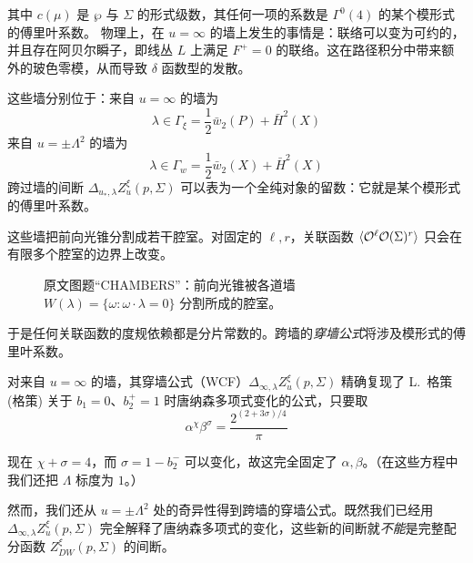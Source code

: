 其中 $c(\mu)$ 是 $\wp$ 与 $\Sigma$ 的形式级数，其任何一项的系数是 $\Gamma^{0}(4)$ 的某个模形式的傅里叶系数。
物理上，在 $u=\infty$ 的墙上发生的事情是：联络可以变为可约的，并且存在阿贝尔瞬子，即线丛 $L$ 上满足 $F^{+}=0$ 的联络。这在路径积分中带来额外的玻色零模，从而导致 $\delta$ 函数型的发散。

这些墙分别位于：来自 $u=\infty$ 的墙为
\begin{equation}
\lambda\in\Gamma_{\xi}=\frac{1}{2}\bar{w}_2(P)+\bar{H}^{2}(X)
\tag{7.22}
\end{equation}
来自 $u=\pm\Lambda^{2}$ 的墙为
\begin{equation}
\lambda\in\Gamma_{w}=\frac{1}{2}\bar{w}_2(X)+\bar{H}^{2}(X)
\tag{7.23}
\end{equation}
跨过墙的间断 $\Delta_{u_{*},\lambda}Z_u^{\xi}(p,\Sigma)$ 可以表为一个全纯对象的留数：它就是某个模形式的傅里叶系数。

这些墙把前向光锥分割成若干腔室。对固定的 $\ell,r$，关联函数 $\langle\mathcal{O}^{\ell}\mathcal{O}(\Sigma)^{r}\rangle$ 只会在有限多个腔室的边界上改变。

\begin{figure}[H]
  \centering
  \caption{原文图题“CHAMBERS”：前向光锥被各道墙 $W(\lambda)=\{\omega:\omega\cdot\lambda=0\}$ 分割所成的腔室。}
  \label{fig:chambers}
\end{figure}

于是任何关联函数的度规依赖都是分片常数的。跨墙的\emph{穿墙公式}将涉及模形式的傅里叶系数。

对来自 $u=\infty$ 的墙，其穿墙公式（WCF）$\Delta_{\infty,\lambda}Z_u^{\xi}(p,\Sigma)$ 精确复现了 L.~格策 (格策) 关于 $b_1=0$、$b_2^{+}=1$ 时唐纳森多项式变化的公式，只要取
\begin{equation}
\alpha^{\chi}\beta^{\sigma}=\frac{2^{(2+3\sigma)/4}}{\pi}
\tag{7.24}
\end{equation}

现在 $\chi+\sigma=4$，而 $\sigma=1-b_2^{-}$ 可以变化，故这完全固定了 $\alpha,\beta$。（在这些方程中我们还把 $\Lambda$ 标度为 $1$。）

然而，我们还从 $u=\pm\Lambda^{2}$ 处的奇异性得到跨墙的穿墙公式。既然我们已经用 $\Delta_{\infty,\lambda}Z_u^{\xi}(p,\Sigma)$ 完全解释了唐纳森多项式的变化，这些新的间断就\emph{不能}是完整配分函数 $Z_{DW}^{\xi}(p,\Sigma)$ 的间断。
